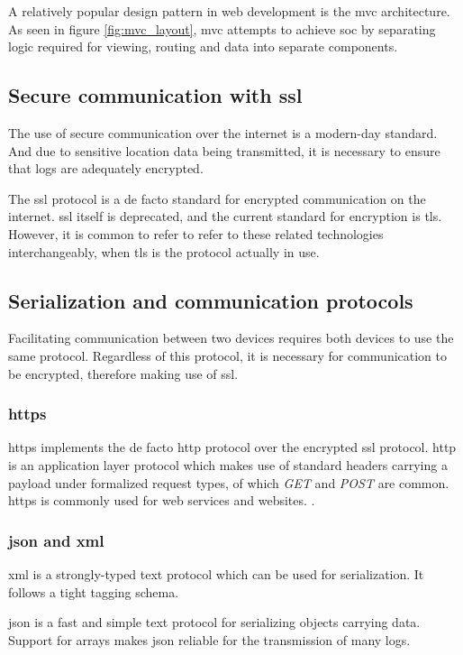A relatively popular design pattern in web development is the \ac{mvc} architecture.
As seen in figure \ref{fig:mvc_layout}, \ac{mvc} attempts to achieve \ac{soc} by separating logic required for viewing, routing and data into separate components.

\subsection{Secure communication with \ac{ssl}}
The use of secure communication over the internet is a modern-day standard.
And due to sensitive location data being transmitted, it is necessary to ensure that logs are adequately encrypted.

The \ac{ssl} protocol is a de facto standard for encrypted communication on the internet.
\Ac{ssl} itself is deprecated, and the current standard for encryption is \ac{tls}.
However, it is common to refer to refer to these related technologies interchangeably, when \ac{tls} is the protocol actually in use. \cite{hickman1995ssl}

\subsection{Serialization and communication protocols}
Facilitating communication between two devices requires both devices to use the same protocol.
Regardless of this protocol, it is necessary for communication to be encrypted, therefore making use of \ac{ssl}.

\subsubsection{\Ac{https}}
\Ac{https} implements the de facto \Ac{http} protocol over the encrypted \ac{ssl} protocol.
\Ac{http} is an application layer protocol which makes use of standard headers carrying a payload under formalized request types, of which \textit{GET} and \textit{POST} are common.
\Ac{https} is commonly used for web services and websites.
\cite{fielding1999hypertext}.

\subsubsection{\Ac{json} and \Ac{xml}}
\Ac{xml} is a strongly-typed text protocol which can be used for serialization.
It follows a tight tagging schema.

\Ac{json} is a fast and simple text protocol for serializing objects carrying data.
Support for arrays makes \ac{json} reliable for the transmission of many logs.
\cite{nurseitov2009comparison}

\pagebreak
